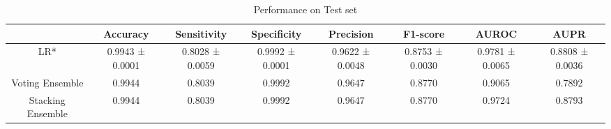 \begin{table}[h!]
    \centering
    \caption{Performance on Test set}
    \begin{adjustbox}{width=\textwidth}
    \begin{tabular}{|c|c|c|c|c|c|c|c|}
    \hline
      & Accuracy & Sensitivity & Specificity & Precision & F1-score & AUROC & AUPR \\
    \hline
    LR* & 0.9943 ± 0.0001 & 0.8028 ± 0.0059 & 0.9992 ± 0.0001 & 0.9622 ± 0.0048 & 0.8753 ± 0.0030 & 0.9781 ± 0.0065 & 0.8808 ± 0.0036 \\
    \hline
    Voting Ensemble & 0.9944 & 0.8039 & 0.9992 & 0.9647 & 0.8770 & 0.9065 & 0.7892 \\
    \hline
    Stacking Ensemble & 0.9944 & 0.8039 & 0.9992 & 0.9647 & 0.8770 & 0.9724 & 0.8793 \\
    \hline
    \end{tabular}
    \end{adjustbox}
    \end{table}
    